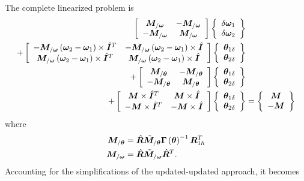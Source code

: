 \documentclass[10pt,fleqn,subeqn]{report}
\newcommand{\T}[1]{\bm{#1}}
\begin{document}
The complete linearized problem is
\begin{align}
	\sqbr{\matr{cc}{
		\T{M}_{/\T{\omega}} & - \T{M}_{/\T{\omega}} \\
		- \T{M}_{/\T{\omega}} & \T{M}_{/\T{\omega}}
	}} \cubr{\cvvect{
		\delta\T{\omega}_1 \\
		\delta\T{\omega}_2
	}} & \nonumber \\
	+ \sqbr{\matr{cc}{
		- \T{M}_{/\T{\omega}} \plbr{\T{\omega}_2 - \T{\omega}_1}\times \hat{\T{I}}^T
			& - \T{M}_{/\T{\omega}} \plbr{\T{\omega}_2 - \T{\omega}_1}\times \hat{\T{I}} \\
		\T{M}_{/\T{\omega}} \plbr{\T{\omega}_2 - \T{\omega}_1}\times \hat{\T{I}}^T
			& \T{M}_{/\T{\omega}} \plbr{\T{\omega}_2 - \T{\omega}_1}\times \hat{\T{I}}
	}} \cubr{\cvvect{
		\T{\theta}_{1\delta} \\
		\T{\theta}_{2\delta}
	}} & \nonumber \\
	+ \sqbr{\matr{cc}{
		\T{M}_{/\T{\theta}} & - \T{M}_{/\T{\theta}} \\
		- \T{M}_{/\T{\theta}} & \T{M}_{/\T{\theta}}
	}} \cubr{\cvvect{
		\T{\theta}_{1\delta} \\
		\T{\theta}_{2\delta}
	}} & \nonumber \\
	+ \sqbr{\matr{cc}{
		\T{M} \times \hat{\T{I}}^T & \T{M} \times \hat{\T{I}} \\
		- \T{M} \times \hat{\T{I}}^T & - \T{M} \times \hat{\T{I}}
	}} \cubr{\cvvect{
		\T{\theta}_{1\delta} \\
		\T{\theta}_{2\delta}
	}} &= \cubr{\cvvect{
		\T{M} \\
		- \T{M}
	}}
\end{align}
where
\begin{subequations}
\begin{align}
	\T{M}_{/\T{\theta}} &= \hat{\T{R}} \tilde{\T{M}}_{/\T{\theta}} \T{\Gamma}\plbr{\T{\theta}}^{-1} \T{R}_{1h}^T \\
	\T{M}_{/\T{\omega}} &= \hat{\T{R}} \tilde{\T{M}}_{/\T{\omega}} \hat{\T{R}}^T .
\end{align}
\end{subequations}
Accounting for the simplifications of the updated-updated approach, it becomes
\end{document}
